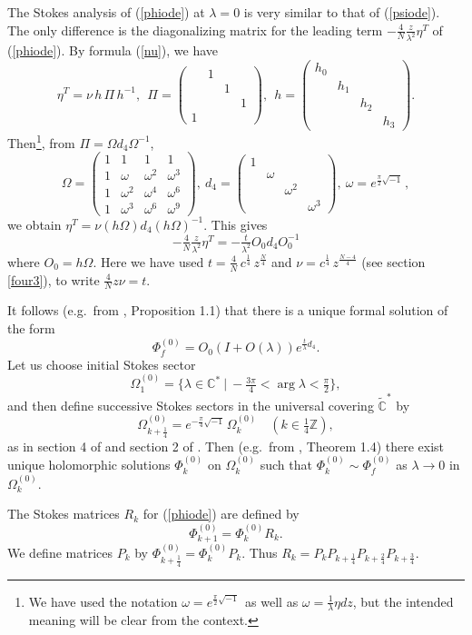 \documentclass[a4paper,12pt,leqno]{amsart}
\numberwithin{equation}{section}
\theoremstyle{plain}
\theoremstyle{definition}
\newcommand{\C}{\mathbb C}
\newcommand{\Z}{\mathbb Z}
\newcommand{\la}{\lambda}
\newcommand{\Om}{\Omega}
\newcommand{\om}{\omega}
\DeclareMathOperator{\argu}{arg}
\newcommand{\no}{\noindent}
\newcommand{\st}{\ \vert\ }
\newcommand{\bp}{\begin{pmatrix}}
\newcommand{\ep}{\end{pmatrix}}
\renewcommand{\i}{ {\scriptscriptstyle\sqrt{-1}}\, }
\newcommand{\Omz}{  \Om^{(0)}  }
\newcommand{\Phiz}{\Phi^{(0)}}
\begin{document}
\no{\em Analysis at $\la=0$.}

The Stokes analysis of (\ref{phiode}) at $\la=0$ is very similar to that of (\ref{psiode}). The only difference is the diagonalizing matrix for the leading term $-\tfrac 4N \tfrac z{\la^2} \eta^T$ of (\ref{phiode}).  By formula (\ref{nu}), we have
\[
\eta^T=\nu\, h \, \Pi \, h^{-1}, \ \  
\Pi=
\bp
  & \!1\! & & \\
 & & \!1\! & \\
  & & & \!1\\
1\!   & & &
\ep,\ \ 
h=
\bp
\! h_0\!\! & & & \\
 & \!\!  h_1\!\!  & & \\
  & & \!\!  h_2\!\!  & \\
   & & & \!\!  h_3\!
\ep.
\]
Then\footnote{We have used the notation $\om=e^{\frac\pi2 \i}$ as well as $\om=\tfrac1\la\eta dz$,
but the intended meaning will be clear from the context.}, from
$\Pi=\Om d_4 \Om^{-1}$, 
\[
\Om=
\bp
1 & 1& 1 & 1\\
1 & \om & \om^2 & \om^3 \\
1 & \om^2 & \om^4 & \om^6 \\
1 & \om^3 & \om^6 & \om^9 
\ep, \ 
d_4=
\bp
\!1\! & & & \\
 & \!\om\! & & \\
  & & \!\!\om^2\!\! & \\
  & & & \!\!\om^3\!
\ep,\ 
\om=e^{\frac\pi2 \i},
\]
we obtain
$
\eta^T=\nu (h\Om) d_4 (h\Om)^{-1}.
$
This gives 
\[
-\tfrac 4N \tfrac z{\la^2} \eta^T = -\tfrac t{\la^2} O_0 d_4 O_0^{-1}
\]
where $O_0=h\Om$. Here we have used
$t=\tfrac{4}N \, c^{\frac1{4}} \, z^{\frac N{4}}$ and $\nu=
c^{\frac1{4}} \, z^{\frac {N-4}{4}}$ (see section \ref{four3}),  to write $\tfrac 4N z\nu =t$.

It follows (e.g.\ from \cite{FIKN06}, Proposition 1.1) that there is a unique formal solution of the form
\[
\Phiz_f=O_0 (I+O(\la) ) e^{\frac t\la d_4}.
\]
Let us choose initial Stokes sector
\[
\Omz_1=\{ \la\in\C^\ast \st -\tfrac{3\pi}4<\argu\la <\tfrac\pi2\},
\]
and then define successive Stokes sectors in the universal covering 
$\tilde{\C}^\ast$ by
\[
\Omz_{k+\frac14}= e^{-\frac\pi4\i} \Omz_k \quad (k\in \tfrac14\Z),
\]
as in section 4 of \cite{GuItLiXX} and
section 2 of \cite{GuItLi15}.
Then (e.g.\ from \cite{FIKN06}, Theorem 1.4) there exist unique holomorphic solutions 
$\Phiz_k$ on $\Omz_k$ 
such that 
$\Phiz_k\sim\Phiz_f$ as $\la\to0$ in $\Omz_k$. 

The Stokes matrices $R_k$ for (\ref{phiode}) are defined by 
\[
\Phiz_{k+1}=\Phiz_k R_k.
\]
We define matrices $P_k$ by $\Phiz_{k+\frac14}=\Phiz_k P_k$.  Thus 
$R_k=P_k P_{k+\frac14}P_{k+\frac24}P_{k+\frac34}$.
\end{document}
